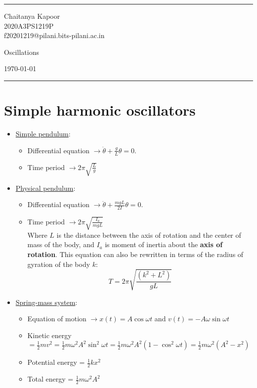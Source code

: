 \documentclass[a4paper]{article}
\begin{document}

\fancyhead[C]{}
\hrule \medskip %
\begin{minipage}{0.295\textwidth} 
\raggedright
\footnotesize
Chaitanya Kapoor \hfill\\   
2020A3PS1219P\hfill\\
f20201219@pilani.bits-pilani.ac.in
\end{minipage}
\begin{minipage}{0.4\textwidth} 
\centering 
\Large
Oscillations 
\end{minipage}
\begin{minipage}{0.295\textwidth} 
\raggedleft
\today\hfill\\
\end{minipage}
\medskip\hrule 
\bigskip

\section{Simple harmonic oscillators}
\begin{itemize}
    \item \underline{Simple pendulum}: 
    \begin{itemize}
        \item Differential equation $\rightarrow \ddot{\theta} + \frac{g}{L}\theta = 0$.   
        \item Time period $\rightarrow 2\pi\sqrt{\frac{L}{g}}$
    \end{itemize}
    \item \underline{Physical pendulum}:
    \begin{itemize}
        \item Differential equation $\rightarrow \ddot{\theta} + \frac{mgL}{2I}\theta = 0$.  
        \item Time period $\rightarrow 2\pi\sqrt{\frac{I_a}{mgL}}$\\ 
        Where $L$ is the distance between the axis of rotation and the center of mass of the body, and $I_a$ is moment of inertia about the \textbf{axis of rotation}. This equation can also be rewritten in terms of the radius of gyration of the body $k$:
        \begin{equation*}
            T = 2\pi\sqrt{\frac{(k^2+L^2)}{gL}}
        \end{equation*}
    \end{itemize}
    \item \underline{Spring-mass system}: 
    \begin{itemize}
        \item Equation of motion $\rightarrow x(t) = A\cos{\omega t}$ and $v(t) = -A\omega\sin{\omega t}$
        \item Kinetic energy $= \frac{1}{2}mv^2 = \frac{1}{2}m\omega^2A^2\sin^2{\omega t} = \frac{1}{2}m\omega^2A^2(1-\cos^2{\omega t}) = \frac{1}{2}m\omega^2(A^2-x^2)$ 
        \item Potential energy = $\frac{1}{2}kx^2$
        \item Total energy = $\frac{1}{2}m\omega^2A^2$
        
    \end{itemize}
\end{itemize}
\end{document}
